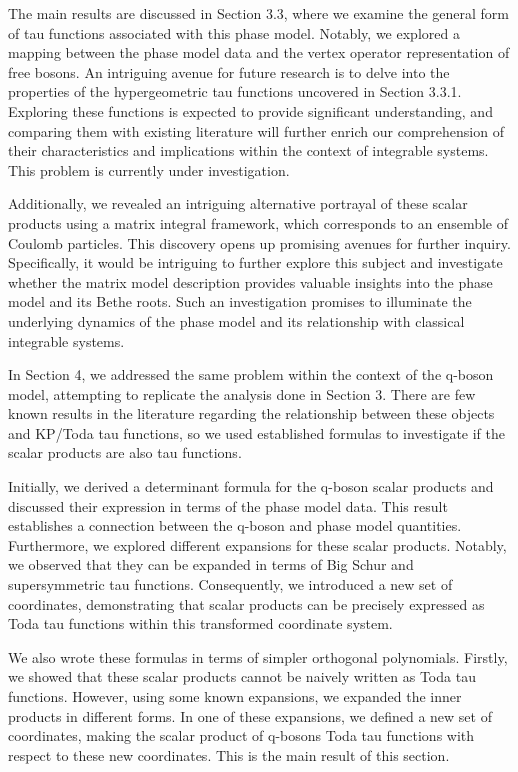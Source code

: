 \documentclass[a4paper,11pt]{amsart}
\begin{document}
The main results are discussed in Section 3.3, where we examine the
general form of tau functions associated with this phase model.
Notably, we explored a mapping between the phase model
data and the vertex operator representation of free bosons. An
intriguing avenue for future research is to delve into the properties
of the hypergeometric tau functions uncovered in Section 3.3.1.
Exploring these functions is expected to provide significant
understanding, and comparing them with existing literature will
further enrich our comprehension of their characteristics and
implications within the context of integrable systems. This problem is
currently under investigation. 

Additionally, we revealed an intriguing alternative portrayal of these
scalar products using a matrix integral framework, which corresponds
to an ensemble of Coulomb particles. This discovery opens up promising
avenues for further inquiry. Specifically, it would be intriguing to
further explore this subject and investigate whether the matrix model
description provides valuable insights into the phase model and its
Bethe roots. Such an investigation promises to illuminate the
underlying dynamics of the phase model and its relationship with
classical integrable systems.

In Section 4, we addressed the same problem within the context of the
q-boson model, attempting to replicate the analysis done in Section
3. There are few known results in the literature regarding the
relationship between these objects and KP/Toda tau functions, so we
used established formulas to investigate if the scalar products are
also tau functions.

Initially, we derived a determinant formula for the q-boson scalar
products and discussed their expression in terms of the phase model
data. This result establishes a connection between the q-boson and
phase model quantities. Furthermore, we explored different expansions
for these scalar products. Notably, we observed that they can be
expanded in terms of Big Schur and supersymmetric tau
functions. Consequently, we introduced a new set of coordinates,
demonstrating that scalar products can be precisely expressed as Toda
tau functions within this transformed coordinate system.

We also wrote these formulas in terms of simpler orthogonal
polynomials. Firstly, we showed that these scalar products cannot be
naively written as Toda tau functions. However, using some known
expansions, we expanded the inner products in different forms. In one
of these expansions, we defined a new set of coordinates, making the
scalar product of q-bosons Toda tau functions with respect to these
new coordinates. This is the main result of this section.
\end{document}

